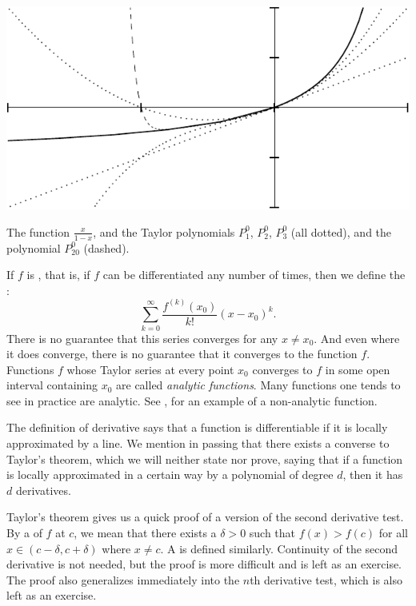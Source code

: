 \begin{myfigureht}
\includegraphics{figures/taylorgeom}
\caption{The function $\frac{x}{1-x}$, and the Taylor polynomials
$P_1^0$, $P_2^0$, $P_3^0$ (all dotted), and the polynomial $P_{20}^0$
(dashed).\label{fig:taylorgeom}}
\end{myfigureht}

If $f$ is \emph{},
that is, if $f$ can be
differentiated any number of times, then 
we define the \emph{}:
\begin{equation*}
\sum_{k=0}^\infty
\frac{f^{(k)}(x_0)}{k!}{(x-x_0)}^k .
\end{equation*}
There is no guarantee that this series converges for any
$x \not= x_0$.  And even where it does converge, there is no guarantee
that it converges to the function $f$.  Functions $f$
whose Taylor series at every point $x_0$
converges to $f$ in some open interval containing $x_0$
are called
\emph{analytic functions}.
Many functions one tends to see in practice are analytic.
See , for an example of a non-analytic
function.

\medskip

The definition of derivative says that
a function is
differentiable if it
is locally approximated by a line.
We mention in passing that there exists a converse to Taylor's
theorem,
which we will neither state nor prove,
saying that if a function is
locally approximated in a certain way by a polynomial of degree $d$, then it
has $d$ derivatives.

\medskip

Taylor's theorem gives us a quick proof of a version of
the second derivative test.
By a \emph{}
of $f$ at $c$,
we mean that there exists a $\delta > 0$ such that $f(x) > f(c)$ for
all $x \in (c-\delta,c+\delta)$ where $x\not=c$.
A \emph{}
is defined similarly.
Continuity of the second derivative is not needed, but the proof is more
difficult and is left as an exercise.  The proof also generalizes
immediately into the $n$th derivative test, which is also left as
an exercise.

